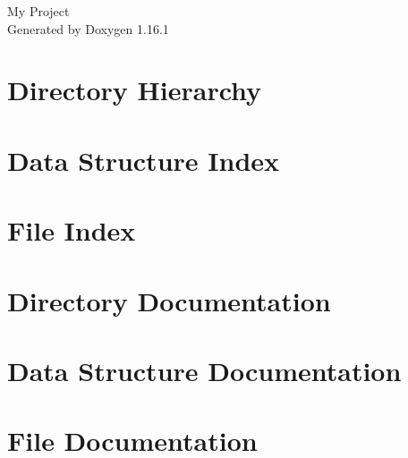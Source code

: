 \documentclass[twoside]{book}
\newcommand{\+}{\discretionary{\mbox{\scriptsize$\hookleftarrow$}}{}{}}
\newcommand{\clearemptydoublepage}{%
    \newpage{\pagestyle{empty}\cleardoublepage}%
  }
\begin{document}
  \raggedbottom
    \hypersetup{pageanchor=false,
                bookmarksnumbered=true,
                pdfencoding=unicode
               }
  \begin{titlepage}
  \vspace*{7cm}
  \begin{center}%
  {\Large My Project}\\
  \vspace*{1cm}
  {\large Generated by Doxygen 1.16.1}\\
  \end{center}
  \end{titlepage}
  \clearemptydoublepage
  \tableofcontents
  \clearemptydoublepage
  \hypersetup{pageanchor=true}
\chapter{Directory Hierarchy}

\chapter{Data Structure Index}

\chapter{File Index}

\chapter{Directory Documentation}




\chapter{Data Structure Documentation}


\chapter{File Documentation}











  \backmatter
  \newpage
  \clearemptydoublepage
  \printindex
\end{document}
